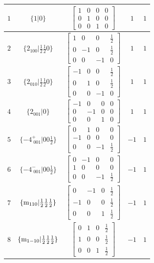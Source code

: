 \documentclass[fleqn,8pt]{jsarticle}
\begin{document}
\begin{longtable}{ccccc}
$ 1 $ & $ \{1|0\} $ & $ \begin{bmatrix} 1 & 0 & 0 & 0 \\ 0 & 1 & 0 & 0 \\ 0 & 0 & 1 & 0 \end{bmatrix} $ & $ 1 $ & $ 1 $ \\ \hline
$ 2 $ & $ \{2{}_{100}|\frac{1}{2} \frac{1}{2} 0\} $ & $ \begin{bmatrix} 1 & 0 & 0 & \frac{1}{2} \\ 0 & -1 & 0 & \frac{1}{2} \\ 0 & 0 & -1 & 0 \end{bmatrix} $ & $ 1 $ & $ 1 $ \\ \hline
$ 3 $ & $ \{2{}_{010}|\frac{1}{2} \frac{1}{2} 0\} $ & $ \begin{bmatrix} -1 & 0 & 0 & \frac{1}{2} \\ 0 & 1 & 0 & \frac{1}{2} \\ 0 & 0 & -1 & 0 \end{bmatrix} $ & $ 1 $ & $ 1 $ \\ \hline
$ 4 $ & $ \{2{}_{001}|0\} $ & $ \begin{bmatrix} -1 & 0 & 0 & 0 \\ 0 & -1 & 0 & 0 \\ 0 & 0 & 1 & 0 \end{bmatrix} $ & $ 1 $ & $ 1 $ \\ \hline
$ 5 $ & $ \{-4^{+}_{\,\,001}|0 0 \frac{1}{2}\} $ & $ \begin{bmatrix} 0 & 1 & 0 & 0 \\ -1 & 0 & 0 & 0 \\ 0 & 0 & -1 & \frac{1}{2} \end{bmatrix} $ & $ -1 $ & $ 1 $ \\ \hline
$ 6 $ & $ \{-4^{-}_{\,\,001}|0 0 \frac{1}{2}\} $ & $ \begin{bmatrix} 0 & -1 & 0 & 0 \\ 1 & 0 & 0 & 0 \\ 0 & 0 & -1 & \frac{1}{2} \end{bmatrix} $ & $ -1 $ & $ 1 $ \\ \hline
$ 7 $ & $ \{{\rm m}_{110}|\frac{1}{2} \frac{1}{2} \frac{1}{2}\} $ & $ \begin{bmatrix} 0 & -1 & 0 & \frac{1}{2} \\ -1 & 0 & 0 & \frac{1}{2} \\ 0 & 0 & 1 & \frac{1}{2} \end{bmatrix} $ & $ -1 $ & $ 1 $ \\ \hline
$ 8 $ & $ \{{\rm m}_{1-10}|\frac{1}{2} \frac{1}{2} \frac{1}{2}\} $ & $ \begin{bmatrix} 0 & 1 & 0 & \frac{1}{2} \\ 1 & 0 & 0 & \frac{1}{2} \\ 0 & 0 & 1 & \frac{1}{2} \end{bmatrix} $ & $ -1 $ & $ 1 $ \\ \hline

\end{longtable}
\end{document}

